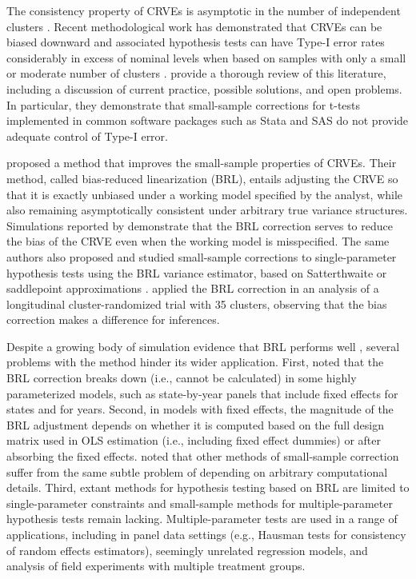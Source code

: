 \documentclass[12pt]{article}
\begin{document}
The consistency property of CRVEs is asymptotic in the number of independent clusters \citep{Wooldridge2003cluster}.
Recent methodological work has demonstrated that CRVEs can be biased downward and associated hypothesis tests can have Type-I error rates considerably in excess of nominal levels when based on samples with only a small or moderate number of clusters \citep[e.g.,][]{Webb2013wild}.
\citet{Cameron2015practitioners} provide a thorough review of this literature, including a discussion of current practice, possible solutions, and open problems. 
In particular, they demonstrate that small-sample corrections for t-tests implemented in common software packages such as Stata and SAS do not provide adequate control of Type-I error. 

\citet[see also \citealt{McCaffrey2001generalizations}]{Bell2002bias} proposed a method that improves the small-sample properties of CRVEs. 
Their method, called bias-reduced linearization (BRL), entails adjusting the CRVE so that it is exactly unbiased under a working model specified by the analyst, while also remaining asymptotically consistent under arbitrary true variance structures. 
Simulations reported by \citet{Bell2002bias} demonstrate that the BRL correction serves to reduce the bias of the CRVE even when the working model is misspecified. 
The same authors also proposed and studied small-sample corrections to single-parameter hypothesis tests using the BRL variance estimator, based on Satterthwaite \citep{Bell2002bias} or saddlepoint approximations \citep{McCaffrey2006improved}. 
\citet{Angrist2009effects} applied the BRL correction in an analysis of a longitudinal cluster-randomized trial with 35 clusters, observing that the bias correction makes a difference for inferences. 

Despite a growing body of simulation evidence that BRL performs well \citep[e.g.,][]{Imbens2015robust}, several problems with the method hinder its wider application. 
First, \citet{Angrist2009mostly} noted that the BRL correction breaks down (i.e., cannot be calculated) in some highly parameterized models, such as state-by-year panels that include fixed effects for states and for years.
Second, in models with fixed effects, the magnitude of the BRL adjustment depends on whether it is computed based on the full design matrix used in OLS estimation (i.e., including fixed effect dummies) or after absorbing the fixed effects. 
\citet{Cameron2015practitioners} noted that other methods of small-sample correction suffer from the same subtle problem of depending on arbitrary computational details.  
Third, extant methods for hypothesis testing based on BRL are limited to single-parameter constraints \citep{Bell2002bias, McCaffrey2006improved} and small-sample methods for multiple-parameter hypothesis tests remain lacking.
Multiple-parameter tests are used in a range of applications, including in panel data settings (e.g., Hausman tests for consistency of random effects estimators), seemingly unrelated regression models, and analysis of field experiments with multiple treatment groups.
\end{document}
